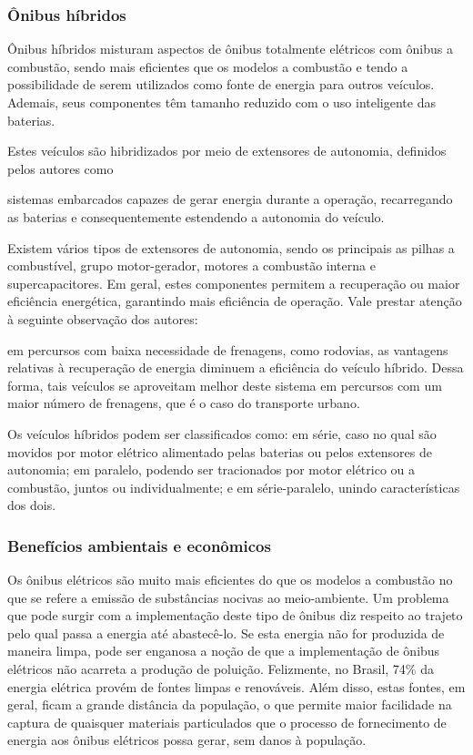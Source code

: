 \subsubsection*{Ônibus híbridos}
Ônibus híbridos misturam aspectos de ônibus totalmente elétricos com ônibus a combustão, sendo mais eficientes que os modelos a combustão e tendo a possibilidade de serem utilizados como fonte de energia para outros veículos. Ademais, seus componentes têm tamanho reduzido com o uso inteligente das baterias.

Estes veículos são hibridizados por meio de extensores de autonomia, definidos pelos autores como

\begin{displayquote}
    \textelp{} sistemas embarcados capazes de gerar energia durante a operação, recarregando as baterias e consequentemente estendendo a autonomia do veículo.
\end{displayquote}

Existem vários tipos de extensores de autonomia, sendo os principais as pilhas a combustível, grupo motor-gerador, motores a combustão interna e supercapacitores. Em geral, estes componentes permitem a recuperação ou maior eficiência energética, garantindo mais eficiência de operação. Vale prestar atenção à seguinte observação dos autores:

\begin{displayquote}
    \textelp{} em percursos com baixa necessidade de frenagens, como rodovias, as vantagens relativas à recuperação de energia diminuem a eficiência do veículo híbrido. Dessa forma, tais veículos se aproveitam melhor deste sistema em percursos com um maior número de frenagens, que é o caso do transporte urbano.
\end{displayquote}

Os veículos híbridos podem ser classificados como: em série, caso no qual são movidos por motor elétrico alimentado pelas baterias ou pelos extensores de autonomia; em paralelo, podendo ser tracionados por motor elétrico ou a combustão, juntos ou individualmente; e em série-paralelo, unindo características dos dois.

\subsubsection*{Benefícios ambientais e econômicos}
Os ônibus elétricos são muito mais eficientes do que os modelos a combustão no que se refere a emissão de substâncias nocivas ao meio-ambiente. Um problema que pode surgir com a implementação deste tipo de ônibus diz respeito ao trajeto pelo qual passa a energia até abastecê-lo. Se esta energia não for produzida de maneira limpa, pode ser enganosa a noção de que a implementação de ônibus elétricos não acarreta a produção de poluição. Felizmente, no Brasil, 74\% da energia elétrica provém de fontes limpas e renováveis. Além disso, estas fontes, em geral, ficam a grande distância da população, o que permite maior facilidade na captura de quaisquer materiais particulados que o processo de fornecimento de energia aos ônibus elétricos possa gerar, sem danos à população.


